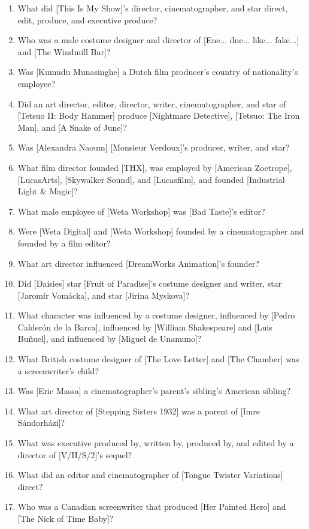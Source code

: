 \documentclass[letterpaper]{article}
\begin{document}
\begin{enumerate}
    \item What did [This Is My Show]'s director, cinematographer, and star direct, edit, produce, and executive produce?
    \item Who was a male costume designer and director of [Ene... due... like... fake...] and [The Windmill Bar]?
    \item Was [Kumudu Munasinghe] a Dutch film producer's country of nationality's employee?\label{debatable2}
    \item Did an art director, editor, director, writer, cinematographer, and star of [Tetsuo II: Body Hammer] produce [Nightmare Detective], [Tetsuo: The Iron Man], and [A Snake of June]?
    \item Was [Alexandra Naoum] [Monsieur Verdoux]'s producer, writer, and star?
    \item What film director founded [THX], was employed by [American Zoetrope], [LucasArts], [Skywalker Sound], and [Lucasfilm], and founded [Industrial Light \& Magic]?
    \item What male employee of [Weta Workshop] was [Bad Taste]'s editor?
    \item Were [Weta Digital] and [Weta Workshop] founded by a cinematographer and founded by a film editor?
    \item What art director influenced [DreamWorks Animation]'s founder?
    \item Did [Daisies] star [Fruit of Paradise]'s costume designer and writer, star [Jarom\'{i}r Vom\'{a}cka], and star [Jirina Myskova]?
    \item What character was influenced by a costume designer, influenced by [Pedro Calder\'{o}n de la Barca], influenced by [William Shakespeare] and [Luis Bu\~{n}uel], and influenced by [Miguel de Unamuno]?\label{debatable3}
    \item What British costume designer of [The Love Letter] and [The Chamber] was a screenwriter's child?
    \item Was [Eric Massa] a cinematographer's parent's sibling's American sibling?
    \item What art director of [Stepping Sisters 1932] was a parent of [Imre S\'{a}ndorh\'{a}zi]?
    \item What was executive produced by, written by, produced by, and edited by a director of [V/H/S/2]'s sequel?
    \item What did an editor and cinematographer of [Tongue Twister Variations] direct?
    \item Who was a Canadian screenwriter that produced [Her Painted Hero] and [The Nick of Time Baby]?

\end{enumerate}
\end{document}
